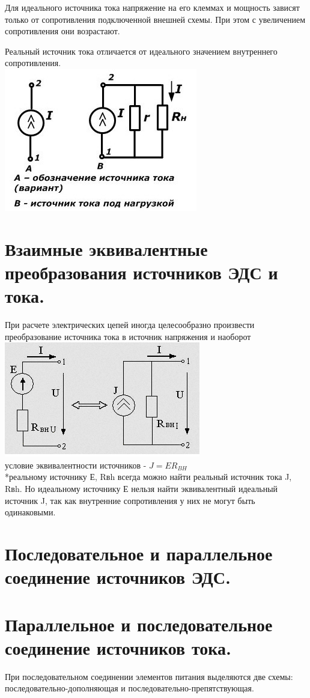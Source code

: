 \documentclass[a4paper, 12pt]{article}
\begin{document}
Для идеального источника тока напряжение на его клеммах и мощность зависят только от сопротивления подключенной внешней схемы. При этом с увеличением сопротивления они возрастают. 

Реальный источник тока отличается от идеального значением внутреннего сопротивления.\\ 
\includegraphics{7-1.png}
\section{Взаимные эквивалентные преобразования источников ЭДС и тока.}
При расчете электрических цепей иногда целесообразно произвести преобразование источника тока в источник напряжения и наоборот\\
\includegraphics{8-1.png}\\
условие эквивалентности источников - $ J = E R_{BH} $\\
*реальному источнику Е, Rвh всегда можно найти реальный источник тока J, Rвh. Но идеальному источнику Е нельзя найти эквивалентный идеальный источник J, так как внутренние сопротивления у них не могут
быть одинаковыми.
\section{Последовательное и параллельное соединение источников ЭДС.}
\section{Параллельное и последовательное соединение источников тока.}
При последовательном соединении элементов питания выделяются две схемы: последовательно-дополняющая и последовательно-препятствующая.
\end{document}
